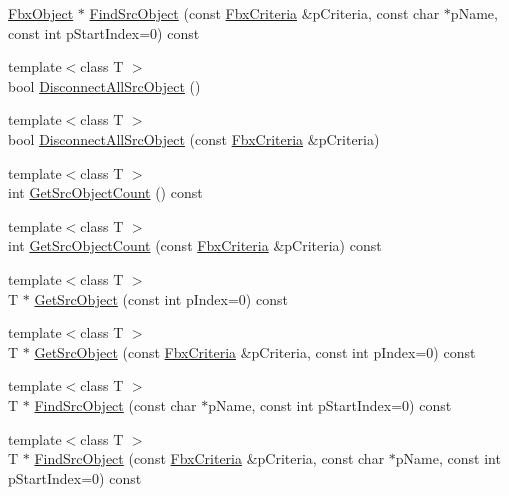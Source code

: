 \begin{DoxyCompactItemize}
\item 
\hyperlink{class_fbx_object}{Fbx\+Object} $\ast$ \hyperlink{class_fbx_property_a225b5e5f588ea9a0bacfc03c9843ee15}{Find\+Src\+Object} (const \hyperlink{class_fbx_criteria}{Fbx\+Criteria} \&p\+Criteria, const char $\ast$p\+Name, const int p\+Start\+Index=0) const
\item 
{\footnotesize template$<$class T $>$ }\\bool \hyperlink{class_fbx_property_a70f1adf2711c5bd6f3d7c1f6f9c7ddf2}{Disconnect\+All\+Src\+Object} ()
\item 
{\footnotesize template$<$class T $>$ }\\bool \hyperlink{class_fbx_property_ab176817ac3ddc88c86d28006b066bc26}{Disconnect\+All\+Src\+Object} (const \hyperlink{class_fbx_criteria}{Fbx\+Criteria} \&p\+Criteria)
\item 
{\footnotesize template$<$class T $>$ }\\int \hyperlink{class_fbx_property_a876b4f2219a1ca16337f35b27a76eed4}{Get\+Src\+Object\+Count} () const
\item 
{\footnotesize template$<$class T $>$ }\\int \hyperlink{class_fbx_property_a4a79c28a713cafebad7254bd68b05a2f}{Get\+Src\+Object\+Count} (const \hyperlink{class_fbx_criteria}{Fbx\+Criteria} \&p\+Criteria) const
\item 
{\footnotesize template$<$class T $>$ }\\T $\ast$ \hyperlink{class_fbx_property_a75fae8a9182ea51767ade157d614227a}{Get\+Src\+Object} (const int p\+Index=0) const
\item 
{\footnotesize template$<$class T $>$ }\\T $\ast$ \hyperlink{class_fbx_property_ac8ef2f7e7ea3fbfc19ca6202d4b8faf7}{Get\+Src\+Object} (const \hyperlink{class_fbx_criteria}{Fbx\+Criteria} \&p\+Criteria, const int p\+Index=0) const
\item 
{\footnotesize template$<$class T $>$ }\\T $\ast$ \hyperlink{class_fbx_property_ac7e7b3ac3ef1eb2a2c1178cf36047cbe}{Find\+Src\+Object} (const char $\ast$p\+Name, const int p\+Start\+Index=0) const
\item 
{\footnotesize template$<$class T $>$ }\\T $\ast$ \hyperlink{class_fbx_property_ab13fcbae9e768a074f40464670cbc462}{Find\+Src\+Object} (const \hyperlink{class_fbx_criteria}{Fbx\+Criteria} \&p\+Criteria, const char $\ast$p\+Name, const int p\+Start\+Index=0) const
\item 

\end{DoxyCompactItemize}

